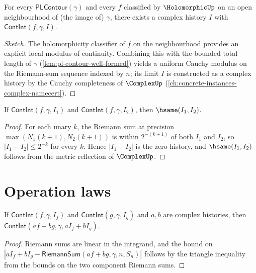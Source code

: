 \begin{lemma}
\label{lem:cont-int-exists}
For every \(\mathsf{PLContour}(\gamma)\) and every \(f\) classified by \(\HolomorphicUp\) on an open neighbourhood of (the image of) \(\gamma\), there exists a complex history \(I\) with \(\mathsf{ContInt}(f, \gamma, I)\).
\end{lemma}
\begin{proof}[Sketch]
The holomorphicity classifier of \(f\) on the neighbourhood provides an explicit local modulus of continuity. Combining this with the bounded total length of \(\gamma\) (\autoref{lem:pl-contour-well-formed}) yields a uniform Cauchy modulus on the Riemann-sum sequence indexed by \(n\); its limit \(I\) is constructed as a complex history by the Cauchy completeness of \(\ComplexUp\) (\autoref{ch:concrete-instances-complex-namecert}).
\end{proof}

\begin{theorem}
\label{thm:cont-int-unique}
If \(\mathsf{ContInt}(f, \gamma, I_1)\) and \(\mathsf{ContInt}(f, \gamma, I_2)\), then \(\hsame(I_1, I_2)\).
\end{theorem}
\begin{proof}
For each unary \(k\), the Riemann sum at precision \(\max(N_1(k+1), N_2(k+1))\) is within \(2^{-(k+1)}\) of both \(I_1\) and \(I_2\), so \(|I_1 - I_2| \leq 2^{-k}\) for every \(k\). Hence \(|I_1 - I_2|\) is the zero history, and \(\hsame(I_1, I_2)\) follows from the metric reflection of \(\ComplexUp\).
\end{proof}

\section{Operation laws}

\begin{lemma}
\label{lem:cont-int-linear}
If \(\mathsf{ContInt}(f, \gamma, I_f)\) and \(\mathsf{ContInt}(g, \gamma, I_g)\) and \(a, b\) are complex histories, then \(\mathsf{ContInt}(a f + b g, \gamma, a I_f + b I_g)\).
\end{lemma}
\begin{proof}
Riemann sums are linear in the integrand, and the bound on \(|aI_f + bI_g - \mathsf{RiemannSum}(af + bg, \gamma, n, S_n)|\) follows by the triangle inequality from the bounds on the two component Riemann sums.
\end{proof}

